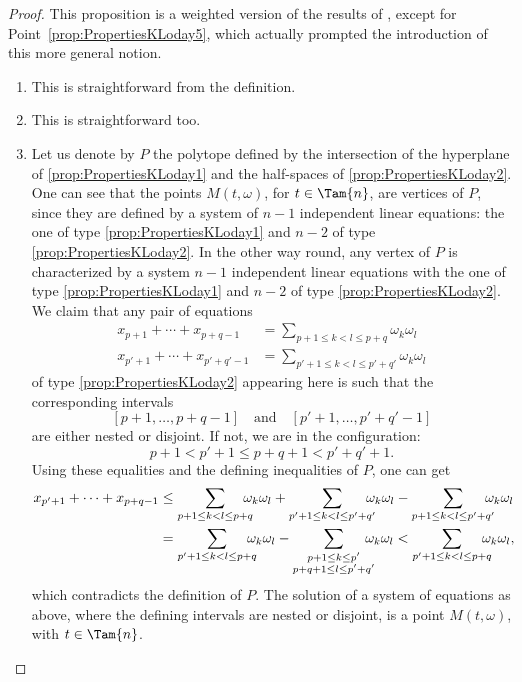 \begin{proof}
This proposition is a weighted version of the results of \cite{Loday04a}, except for Point~\eqref{prop:PropertiesKLoday5}, which actually prompted the introduction of this more general notion.
\leavevmode
\begin{enumerate}
\item This is straightforward from the definition.
\item This is straightforward too.
\item Let us denote by $P$ the polytope defined by the intersection of the hyperplane of \eqref{prop:PropertiesKLoday1} and the half-spaces of \eqref{prop:PropertiesKLoday2}.
One can see that the points $M(t, \omega)$, for $t\in \Tam{n}$, are vertices of $P$, since they are defined by a system of $n-1$ independent linear equations: the one of type \eqref{prop:PropertiesKLoday1} and $n-2$ of type \eqref{prop:PropertiesKLoday2}.
In the other way round, any vertex of $P$ is characterized by a system $n-1$ independent linear equations with the one of type \eqref{prop:PropertiesKLoday1} and $n-2$ of type \eqref{prop:PropertiesKLoday2}. We claim that any pair of equations
\begin{align*}
x_{p+1}+\cdots+x_{p+q-1}&= \sum_{p+1\leq k<l\leq p+q} \omega_k \omega_l\\
\tag*{and}
x_{p'+1}+\cdots+x_{p'+q'-1}&= \sum_{p'+1\leq k<l\leq p'+q'} \omega_k \omega_l
\end{align*}
of type \eqref{prop:PropertiesKLoday2} appearing here is such that the corresponding intervals
\[
[p+1, \ldots, p+q-1]\quad\text{and}\quad [p'+1, \ldots, p'+q'-1]
\]
are either nested or disjoint.
If not, we are in the configuration:
\[
p+1<p'+1\leq p+q+1<p'+q'+1.
\]
Using these equalities and the defining inequalities of $P$, one can get
\begin{align*}
x_{p'+1}+\cdots+x_{p+q-1}&\leq
\sum_{p+1\leq k<l\leq p+q}\hspace*{-3mm} \omega_k \omega_l
+\sum_{p'+1\leq k<l\leq p'+q'}\hspace*{-3mm} \omega_k \omega_l
-\sum_{p+1\leq k<l\leq p'+q'}\hspace*{-3mm} \omega_k \omega_l \\
&=
\sum_{p'+1\leq k<l\leq p+q}\hspace*{-3mm} \omega_k \omega_l
-
\sum_{\substack{p+1\leq k\leq p'\\ p+q+1\leq l\leq p'+q'}}\hspace*{-3mm} \omega_k \omega_l
< \sum_{p'+1\leq k<l\leq p+q}\hspace*{-3mm} \omega_k \omega_l,
\end{align*}
which contradicts the definition of $P$.
The solution of a system of equations as above, where the defining intervals are nested or disjoint, is a point
$M(t,\omega)$, with
$t\in \Tam{n}$.


\end{enumerate}
\end{proof}
